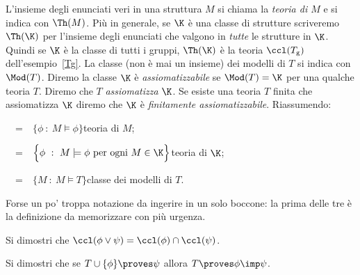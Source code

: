 L'insieme degli enunciati veri in una struttura $M$ si chiama la \emph{teoria di $M$\/} e si indica con \emph{$\Th(M)$}. Pi\`u in generale, se $\K$ \`e una classe di strutture scriveremo \emph{$\Th(\K)$} per l'insieme degli enunciati che valgono in \textit{tutte\/} le strutture in $\K$. Quindi se $\K$ \`e la classe di tutti i gruppi, $\Th(\K)$ \`e la teoria $\ccl(T_{\rm g})$ dell'esempio~\ref{Tg}. La classe (non \`e mai un insieme) dei modelli di $T$ si indica con \emph{$\Mod(T)$}. Diremo la classe $\K$ \`e \emph{assiomatizzabile\/} se $\Mod(T)=\K$ per una qualche teoria $T$. Diremo che $T$ \emph{assiomatizza\/} $\K$. Se esiste una teoria $T$ finita che assiomatizza $\K$ diremo che $\K$ \`e \emph{finitamente assiomatizzabile}. Riassumendo:

\hspace*{14ex}\ \ =\ \ $\Big\{\phi\ :\ M\models\phi\Big\}$\hfill teoria di $M$;

\hspace*{14ex}\llap{$\Th(\K)$}\ \ =\ \ $\Big\{\phi\ :\ M\models\phi \textrm{ per ogni }M\in\K\Big\}$\hfill teoria di $\K$;

\hspace*{14ex}\ \ =\ \ $\Big\{M\ :\ M\models T\Big\}$\hfill classe dei modelli di $T$.

Forse un po' troppa notazione da ingerire in un solo boccone: la prima delle tre \`e la definizione da memorizzare con pi\`u urgenza.


\begin{exercise}
Si dimostri che $\ccl(\phi\vee \psi)=\ccl(\phi)\cap\ccl(\psi)$.\QED
\end{exercise}

\begin{exercise}\label{modus ponens}
Si dimostri che se $T\cup\{\phi\}\proves\psi$ allora $T\proves\phi\imp\psi$.\QED
\end{exercise}


